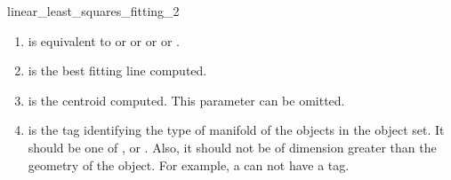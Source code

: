 \begin{ccRefFunction}{linear_least_squares_fitting_2}

\begin{enumerate}
   \item  {} is equivalent to  or 
           or  or  or
          .
   \item  {} is the best fitting line computed.
   \item  {} is the centroid computed. This parameter can be
          omitted.
   \item  {} is the tag identifying the type of manifold of the objects in the object set. It should be one of ,  or . Also, it should not be of dimension greater than the geometry of the object. For example, a  can not have a  tag.
\end{enumerate}

\end{ccRefFunction}
